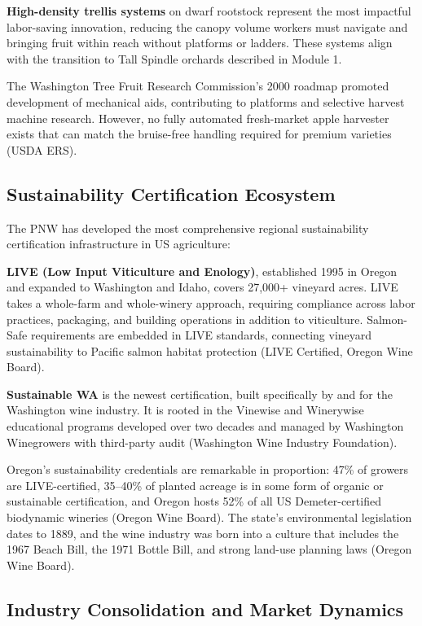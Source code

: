 \documentclass[11pt,letterpaper]{article}
\begin{document}
\textbf{High-density trellis systems} on dwarf rootstock represent the most impactful labor-saving innovation, reducing the canopy volume workers must navigate and bringing fruit within reach without platforms or ladders. These systems align with the transition to Tall Spindle orchards described in Module 1.

The Washington Tree Fruit Research Commission's 2000 roadmap promoted development of mechanical aids, contributing to platforms and selective harvest machine research. However, no fully automated fresh-market apple harvester exists that can match the bruise-free handling required for premium varieties (USDA ERS).

\subsection{Sustainability Certification Ecosystem}

The PNW has developed the most comprehensive regional sustainability certification infrastructure in US agriculture:

\textbf{LIVE (Low Input Viticulture and Enology)}, established 1995 in Oregon and expanded to Washington and Idaho, covers 27,000+ vineyard acres. LIVE takes a whole-farm and whole-winery approach, requiring compliance across labor practices, packaging, and building operations in addition to viticulture. Salmon-Safe requirements are embedded in LIVE standards, connecting vineyard sustainability to Pacific salmon habitat protection (LIVE Certified, Oregon Wine Board).

\textbf{Sustainable WA} is the newest certification, built specifically by and for the Washington wine industry. It is rooted in the Vinewise and Winerywise educational programs developed over two decades and managed by Washington Winegrowers with third-party audit (Washington Wine Industry Foundation).

Oregon's sustainability credentials are remarkable in proportion: 47\% of growers are LIVE-certified, 35--40\% of planted acreage is in some form of organic or sustainable certification, and Oregon hosts 52\% of all US Demeter-certified biodynamic wineries (Oregon Wine Board). The state's environmental legislation dates to 1889, and the wine industry was born into a culture that includes the 1967 Beach Bill, the 1971 Bottle Bill, and strong land-use planning laws (Oregon Wine Board).

\subsection{Industry Consolidation and Market Dynamics}
\end{document}
